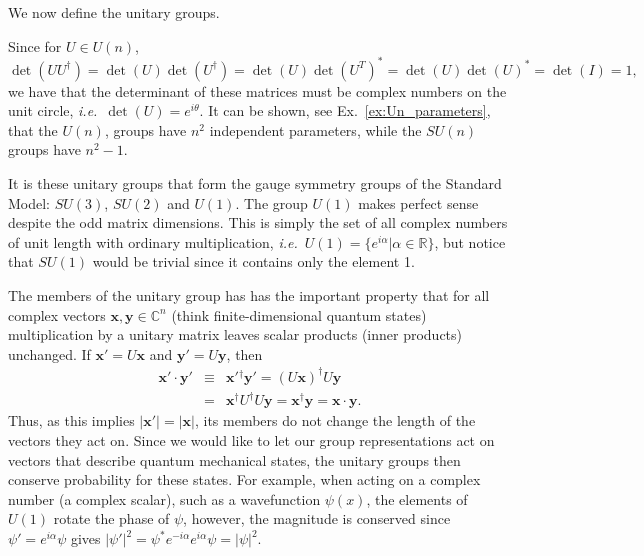 \documentclass[notes.tex]{subfiles}
\begin{document}
We now define the unitary groups.

Since for $U\in U(n)$,
\[\det(UU^\dagger)=\det(U)\det(U^\dagger)=\det(U)\det(U^T)^*=\det(U)\det(U)^*=\det(I)=1,\] 
we have that the determinant of these matrices must be complex numbers on the unit circle, {\it i.e.}\ $\det(U)=e^{i\theta}$.
It can be shown, see Ex.~\ref{ex:Un_parameters}, that the $U(n)$, groups have $n^2$ independent parameters, while the $SU(n)$ groups have $n^2-1$.

It is these unitary groups that form the gauge symmetry groups of the Standard Model: $SU(3)$, $SU(2)$ and $U(1)$. The group $U(1)$ makes perfect sense despite the odd matrix dimensions. This is simply the set of all complex numbers of unit length with ordinary multiplication, {\it i.e.}\ $U(1)=\{e^{i\alpha} | \alpha \in\mathbb{R} \}$, but notice that $SU(1)$ would be trivial since it contains only the element 1. 

The members of the unitary group has has the important property that for all complex vectors $\mathbf{x}, \mathbf{y} \in \mathbb{C}^n$ (think finite-dimensional quantum states)  multiplication by  a unitary matrix leaves scalar products (inner products) unchanged. If $\mathbf{x}'=U\mathbf{x}$ and $\mathbf{y}'=U\mathbf{y}$, then
\begin{eqnarray}
\mathbf{x}'\cdot \mathbf{y}' &\equiv& \mathbf{x}'{}^\dagger \mathbf{y}' = (U\mathbf{x})^\dagger U\mathbf{y}\nonumber\\
&=& \mathbf{x}^\dagger U^\dagger U\mathbf{y} = \mathbf{x}^\dagger \mathbf{y} = \mathbf{x} \cdot \mathbf{y}.\nonumber
\end{eqnarray}
Thus, as this implies $|\mathbf{x}'|=|\mathbf{x}|$, its members do not change the length of the vectors they act on.  Since we would like to let our group representations act on vectors that describe quantum mechanical states, the unitary groups then conserve probability for these states. For example, when acting on a complex number (a complex scalar), such as a wavefunction $\psi(x)$, the elements of $U(1)$ rotate the phase of $\psi$, however, the magnitude is conserved since $\psi'=e^{i\alpha}\psi$ gives $|\psi'|^2=\psi^*e^{-i\alpha}e^{i\alpha}\psi=|\psi|^2$.
\end{document}
